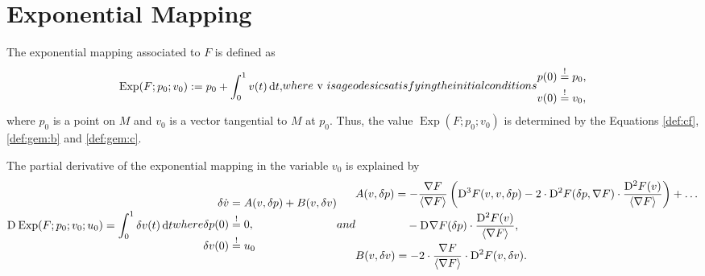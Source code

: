 \section{Exponential Mapping}

The exponential mapping associated to $ F $ is defined as
\begin{subequations}
    \label{def:gem}
    \begin{align}
        \label{def:gem:a}
        \operatorname{Exp}( F; p_0; v_0 )  :=
        p_0  +  \int^1_0 v( t ) \intd{ t } ,
    \end{align}
    where $ v $ is a geodesic satisfying the initial conditions
    \begin{align}
        p( 0 )  &\overset{ ! }{ = }   p_0 ,
        \label{def:gem:b}\\
        v( 0 )  &\overset{ ! }{ = }   v_0 ,
        \label{def:gem:c}
    \end{align}
\end{subequations}
where $ p_0 $ is a point on $ M $ and
$ v_0 $ is a vector tangential to $ M $ at $ p_0 $.
Thus, the value $ \operatorname{Exp}(F;p_0;v_0) $
is determined by the Equations \eqref{def:cf},
\eqref{def:gem:b} and \eqref{def:gem:c}.


The partial derivative of the exponential mapping
in the variable $ v_0 $ is explained by
\begin{subequations}
    \label{def:dgem}
    \begin{align}
        \diff{}{ \operatorname{Exp} }( F; p_0; v_0; u_0 )  =
        \int^1_0 \delta v( t ) \intd{ t }
        \label{def:dgem:a}
    \end{align}
    where
    \begin{align}
        \delta \dot{ v }   &=
        A( v, \delta p )  +  B( v, \delta v )
        \label{def:dgem:b}\\
        \delta p( 0 )  &\overset{ ! }{ = }  0,
        \label{def:dgem:c}\\
        \delta v( 0 )  &\overset{ ! }{ = }  u_0
        \label{def:dgem:d}
    \end{align}
    and
    \begin{align}
        &\begin{aligned}
            A( v, \delta p )   &=
            - \frac{ \grad{F} }{ \skaq{ \grad{F} } }
            \left(  \diff{3}{F}( v, v, \delta p )  -
            2 \mult \diff{2}{F}( \delta p, \grad{F} ) \mult
            \frac{ \diff{2}{F}( v ) }{ \skaq{\grad{F}} }  \right)  +  \dots\\
            &\hphantom{={}} - \diff{}{\grad{F}}( \delta p ) \mult
            \frac{ \diff{2}{F}( v ) }{ \skaq{\grad{F}} } ,
        \end{aligned}
        \label{def:dgem:e}\\
        &B( v, \delta v )   =
        - 2 \mult \frac{ \grad{F} }{ \skaq{ \grad{F} } }  \mult
        \diff{2}{F}( v, \delta v ) .
        \label{def:dgem:f}
    \end{align}
\end{subequations}



